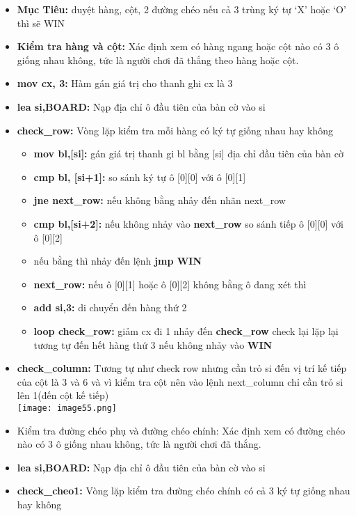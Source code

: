 \begin{itemize}
    \item \textbf{Mục Tiêu:} duyệt hàng, cột, 2 đường chéo nếu cả 3 trùng ký tự ‘X’ hoặc ‘O’ thì sẽ WIN
    \item \textbf{Kiểm tra hàng và cột:} Xác định xem có hàng ngang hoặc cột  nào có 3 ô giống nhau không, tức là người chơi đã thắng theo hàng  hoặc cột.
    \item \textbf{mov cx, 3:} Hàm gán giá trị cho thanh ghi cx là 3
    \item \textbf{lea si,BOARD:} Nạp địa chỉ ô đầu tiên của bàn cờ vào si
    \item \textbf{check\_row: }Vòng lặp kiểm tra mỗi hàng có ký tự giống nhau hay không
    \begin{itemize}
        \item \textbf{mov bl,[si]:} gán giá trị thanh gi bl bằng [si] địa chỉ đầu tiên của bàn cờ
        \item \textbf{cmp bl, [si+1]:} so sánh ký tự ô [0][0] với ô [0][1]
        \item \textbf{jne next\_row:} nếu không bằng nhảy đến nhãn next\_row
        \item \textbf{cmp bl,[si+2]:} nếu không nhảy vào \textbf{next\_row} so sánh tiếp ô [0][0] với ô [0][2]
        \item nếu bằng thì nhảy đến lệnh \textbf{jmp WIN}
        \item \textbf{next\_row: }nếu ô [0][1] hoặc ô [0][2] không bằng ô đang xét thì 
        \item \textbf{add si,3:} di chuyển đến hàng thứ 2
        \item \textbf{loop check\_row:} giảm cx đi 1 nhảy đến \textbf{check\_row} check lại lặp lại tương tự  đến hết hàng thứ 3 nếu không nhảy vào \textbf{WIN}
    \end{itemize}
    \item \textbf{check\_column:} Tương tự như check row nhưng cần trỏ si đến vị trí kế tiếp của cột là 3 và 6 và vì kiểm tra cột nên vào lệnh next\_column chỉ cần trỏ si lên 1(đến cột kế tiếp)\\
    \texttt{[image: image55.png]}
    \item Kiểm tra đường chéo phụ và đường chéo chính: Xác định xem có đường chéo nào có 3 ô giống nhau không, tức là người chơi đã thắng.
    \item \textbf{lea si,BOARD:} Nạp địa chỉ ô đầu tiên của bàn cờ vào si
    \item \textbf{check\_cheo1:} Vòng lặp kiểm tra đường chéo chính có cả 3 ký tự giống nhau hay không

\end{itemize}
